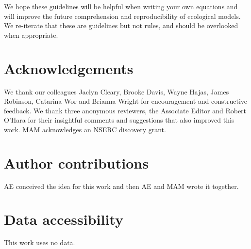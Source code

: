 We hope these guidelines will be helpful when writing your own equations and
will improve the future comprehension and reproducibility of ecological models.
We re-iterate that
these are guidelines but not rules, and should be overlooked when appropriate.

\section*{Acknowledgements}

We thank our colleagues
Jaclyn Cleary,
Brooke Davis,
Wayne Hajas,
James Robinson,
Catarina Wor
and Brianna Wright
for encouragement and constructive feedback.
We thank three anonymous reviewers, the Associate Editor and Robert O'Hara
for their insightful comments and suggestions that also improved this work.
MAM acknowledges an NSERC discovery grant.

\section*{Author contributions} AE conceived the idea for this work
and then AE and MAM wrote it together.

\section*{Data accessibility}

This work uses no data.



\clearpage

\thispagestyle{empty}




